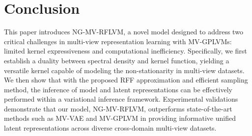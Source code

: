 \vspace{-0.05in}
\section{Conclusion}
\vspace{-0.05in}
\label{sec:conclusion}
 
This paper introduces NG-MV-RFLVM, a novel model designed to address two critical challenges in multi-view representation learning with MV-GPLVMs: limited kernel expressiveness and computational inefficiency.
%
Specifically, we first establish a duality between spectral density and kernel function, yielding a versatile kernel capable of modeling the non-stationarity in multi-view datasets.
%
We then show that with the proposed RFF approximation and efficient sampling method, the inference of model and latent representations can be effectively performed within a variational inference framework. %
Experimental validations demonstrate that our model, NG-MV-RFLVM, outperforms state-of-the-art methods such as MV-VAE and MV-GPLVM in providing informative unified latent representations across diverse cross-domain multi-view datasets. 




